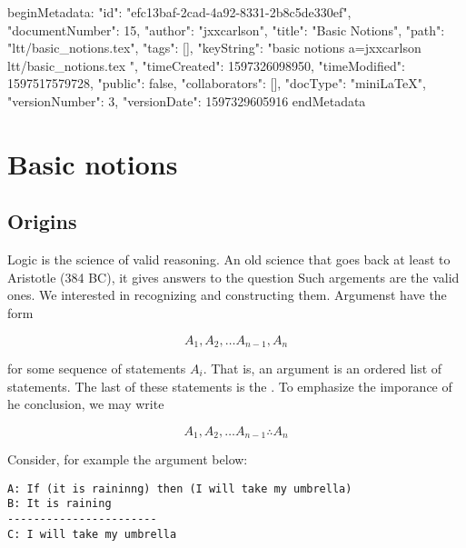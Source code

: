beginMetadata:
{
    "id": "efc13baf-2cad-4a92-8331-2b8c5de330ef",
    "documentNumber": 15,
    "author": "jxxcarlson",
    "title": "Basic Notions",
    "path": "ltt/basic_notions.tex",
    "tags": [],
    "keyString": "basic notions a=jxxcarlson ltt/basic_notions.tex ",
    "timeCreated": 1597326098950,
    "timeModified": 1597517579728,
    "public": false,
    "collaborators": [],
    "docType": "miniLaTeX",
    "versionNumber": 3,
    "versionDate": 1597329605916
}
endMetadata

\begin{mathmacro}
\newcommand{\set}[1]{\{ #1 \}}
\newcommand{\for}[0]{\mathcal{F}}
\newcommand{\axioms}[0]{\mathcal{A}}
\newcommand{\theorems}[0]{\mathcal{T}}
\end{mathmacro}

\section{Basic notions}

\innertableofcontents


\subsection{Origins}

Logic is the science of valid reasoning.  An old science that goes back at least to Aristotle (384 BC), it gives answers to the question 
Such argements are the valid ones.  We interested in recognizing and constructing them. Argumenst have the form

\begin{equation}
\label{argument}
A_1, A_2, \ldots A_{n-1}, A_n
\end{equation}

for some sequence of statements $A_i$.  That is, an argument is an ordered list of statements.  The last of these statements is the .  To emphasize the imporance of he conclusion, we may write

\begin{equation}
\label{argument2}
A_1, A_2, \ldots A_{n-1} \therefore A_n
\end{equation}

Consider, for example the argument below:

\begin{verbatim}
A: If (it is raininng) then (I will take my umbrella)
B: It is raining
-----------------------
C: I will take my umbrella
\end{verbatim}

